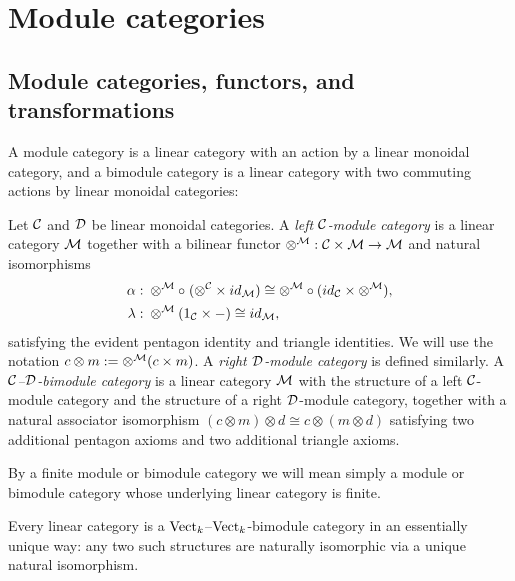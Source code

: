 \documentclass{amsart}
\begin{document}
\section{Module categories} \label{sec:tc-bimod}


\subsection{Module categories, functors, and transformations} %

A module category is a linear category with an action by a linear monoidal category, and a bimodule category is a linear category with two commuting actions by linear monoidal categories:
\begin{definition}
Let $\mathcal C$ and $\mathcal D$ be linear monoidal categories.
A \emph{left $\mathcal C$-module category} is a linear category $\mathcal M$ together with a bilinear functor $\otimes^{\mathcal M}: \mathcal C \times \mathcal M \to \mathcal M$ and natural isomorphisms
\begin{align*}
		\alpha: & \;    \otimes^{\mathcal M} \circ \; (\otimes^{\mathcal C} \times id_{\mathcal M}) \cong  \otimes^{\mathcal M} \circ (id_{\mathcal C} \times \otimes^{\mathcal M}), \\
		\lambda: & \; \otimes^{\mathcal M} (1_{\mathcal C} \times -) \cong id_{\mathcal M},
\end{align*}
satisfying the evident pentagon identity and triangle identities.  We will use the notation $c \otimes m := \otimes^\mathcal M(c \times m)$.  A \emph{right $\mathcal D$-module category} is defined similarly.  A \emph{$\mathcal C$--$\mathcal D$-bimodule category} is a linear category $\mathcal M$ with the structure of a left $\mathcal C$-module category and the structure of a right $\mathcal D$-module category, together with a natural associator isomorphism $(c \otimes m) \otimes d \cong c \otimes (m \otimes d)$ satisfying two additional pentagon axioms and two additional triangle axioms.  
\end{definition}
\nid By a finite module or bimodule category we will mean simply a module or bimodule category whose underlying linear category is finite. 

\begin{example}
	Every linear category is a $\mathrm{Vect}_k$--$\mathrm{Vect}_k$-bimodule category in an essentially unique way: any two such structures are naturally isomorphic via a unique natural isomorphism.
\end{example}
\end{document}
